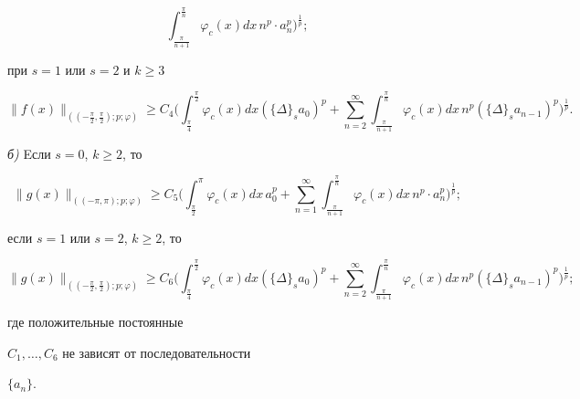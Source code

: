 \begin{assrt}
\begin{equation}
\int_{\frac{\pi}{n+1}}^{\frac{\pi}{n}} \varphi_c(x) dx\,n^p\cdot a_n^p


\bigg)^{\frac{1}{p}};


\end{equation}


при $s=1$ или $s=2$ и $k\geq 3$ 


\begin{equation}


\| f(x)\|_{((-\frac{\pi}{2},\frac{\pi}{2});p;\varphi)}\geq


C_4\bigg(\int_{\frac{\pi}{4}}^{\frac{\pi}{2}} \varphi_c(x) dx


(\{\Delta\}_sa_0)^p+ \sum\limits_{n=2}^{\infty}


\int_{\frac{\pi}{n+1}}^{\frac{\pi}{n}} \varphi_c(x) dx\,n^p


(\{\Delta\}_sa_{n-1})^p \bigg)^{\frac{1}{p}}.


\end{equation}





{\em б)} Eсли $s=0$, $k\geq 2$, то 


\begin{equation}


\| g(x)\|_{((-\pi,\pi);p;\varphi)}\geq


C_5\bigg(\int_{\frac{\pi}{2}}^{\pi} \varphi_c(x) dx\,


a_0^p+\sum\limits_{n=1}^{\infty}


\int_{\frac{\pi}{n+1}}^{\frac{\pi}{n}} \varphi_c(x) dx\,n^p\cdot a_n^p


\bigg)^{\frac{1}{p}};


\end{equation}


если $s=1$ или $s=2$, $k\geq 2$, то


\begin{equation}


\| g(x)\|_{((-\frac{\pi}{2},\frac{\pi}{2});p;\varphi)}\geq


C_6\bigg(\int_{\frac{\pi}{4}}^{\frac{\pi}{2}} \varphi_c(x) dx


(\{\Delta\}_sa_0)^p+\sum\limits_{n=2}^{\infty}


\int_{\frac{\pi}{n+1}}^{\frac{\pi}{n}} \varphi_c(x) dx\,n^p


(\{\Delta\}_sa_{n-1})^p \bigg)^{\frac{1}{p}};


\end{equation}


где положительные постоянные


$C_1,\dotsc,C_6$ не зависят от последовательности


$\{a_n\}$.


\end{assrt}





